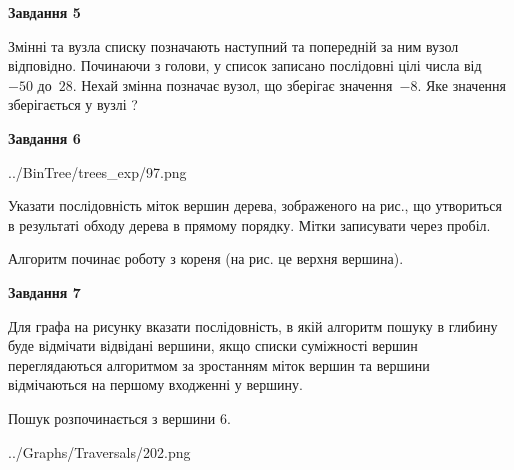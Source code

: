 \documentclass[12pt, ukrainian]{article}
\begin{document}
{\begin {large}
{\begin {center}\textbf{Завдання 5}\end {center}}\par
Змінні  та  вузла списку позначають наступний та попередній за ним вузол відповідно. Починаючи з голови, у список записано послідовні цілі числа від~$-50$ до~$28$. Нехай змінна  позначає вузол, що зберігає значення~$-8$.
Яке значення зберігається у вузлі  ?\par
\newpage

{\begin {center}\textbf{Завдання 6}\end {center}}\par

\begin{center}
	{../BinTree/trees_exp/97.png}
\end{center}
Указати послідовність міток вершин дерева, зображеного на рис., що утвориться в результаті обходу дерева в прямому порядку. Мітки записувати через пробіл.\par Алгоритм починає роботу з кореня (на рис. це верхня вершина).\par
\newpage

{\begin {center}\textbf{Завдання 7}\end {center}}\par
Для графа на рисунку вказати послідовність, в якій алгоритм пошуку в глибину буде відмічати відвідані вершини, якщо списки суміжності вершин переглядаються алгоритмом за зростанням міток вершин та вершини відмічаються на першому вход\-женні у вершину.\par
Пошук розпочинається з вершини 6.\par

\begin{center}
	{../Graphs/Traversals/202.png}
\end{center}\par
\newpage


\end{large}}
\end{document}
